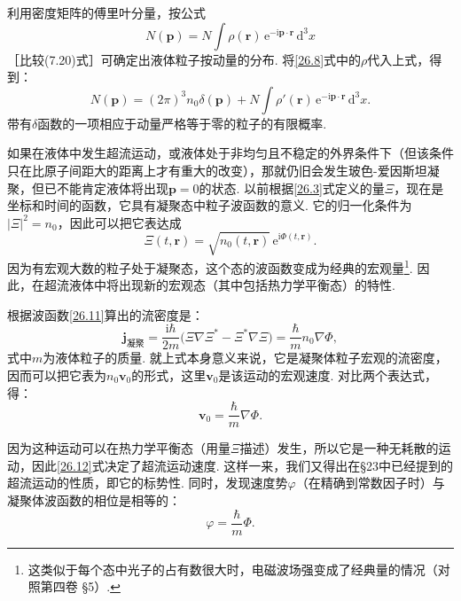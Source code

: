 利用密度矩阵的傅里叶分量，按公式
\begin{equation}
N(\bm{p})=N\int\rho(\bm{r})\,\mathrm{e}^{-\mathrm{i}\bm{p}\cdot\bm{r}}\,\mathrm{d}^{3}x
\label{26.9}
\end{equation}
［比较(7.20)式］可确定出液体粒子按动量的分布. 将\eqref{26.8}式中的$\rho$代入上式，得到：
\begin{equation}
N(\bm{p})=(2\pi)^{3}n_{0}\delta(\bm{p})
+N\int\rho'(\bm{r})\,\mathrm{e}^{-\mathrm{i}\bm{p}\cdot\bm{r}}\,\mathrm{d}^{3}x.
\label{26.10}
\end{equation}
带有$\delta$函数的一项相应于动量严格等于零的粒子的有限概率.

如果在液体中发生超流运动，或液体处于非均匀且不稳定的外界条件下（但该条件只在比原子间距大的距离上才有重大的改变），那就仍旧会发生玻色-爱因斯坦凝聚，但已不能肯定液体将出现$\bm{p}=0$的状态. 以前根据\eqref{26.3}式定义的量$\Xi$，现在是坐标和时间的函数，它具有凝聚态中粒子波函数的意义. 它的归一化条件为$\vert\Xi\vert^{2}=n_{0}$，因此可以把它表达成
\begin{equation}
\Xi(t,\bm{r})=\sqrt{n_{0}(t,\bm{r})}\,\mathrm{e}^{\mathrm{i}\Phi(t,\bm{r})}.
\label{26.11}
\end{equation}
因为有宏观大数的粒子处于凝聚态，这个态的波函数变成为经典的宏观量\footnote{这类似于每个态中光子的占有数很大时，电磁波场强变成了经典量的情况（对照第四卷 §5）.}. 因此，在超流液体中将出现新的宏观态（其中包括热力学平衡态）的特性.

根据波函数\eqref{26.11}算出的流密度是：
\begin{equation*}
\bm{j}_{\text{凝聚}}=\frac{\mathrm{i}\hbar}{2m}
\bigl(\Xi\nabla\Xi^{*}-\Xi^{*}\nabla\Xi\bigr)
=\frac{\hbar}{m}n_{0}\nabla\Phi,
\end{equation*}
式中$m$为液体粒子的质量. 就上式本身意义来说，它是凝聚体粒子宏观的流密度，因而可以把它表为$n_{0}\bm{v}_{0}$的形式，这里$\bm{v}_{0}$是该运动的宏观速度. 对比两个表达式，得：
\begin{equation}
\bm{v}_{0}=\frac{\hbar}{m}\nabla\Phi.
\label{26.12}
\end{equation}

因为这种运动可以在热力学平衡态（用量$\Xi$描述）发生，所以它是一种无耗散的运动，因此\eqref{26.12}式决定了超流运动速度. 这样一来，我们又得出在§23中已经提到的超流运动的性质，即它的标势性. 同时，发现速度势$\varphi$（在精确到常数因子时）与凝聚体波函数的相位是相等的：
\begin{equation}
\varphi=\frac{\hbar}{m}\Phi.
\label{26.13}
\end{equation}

